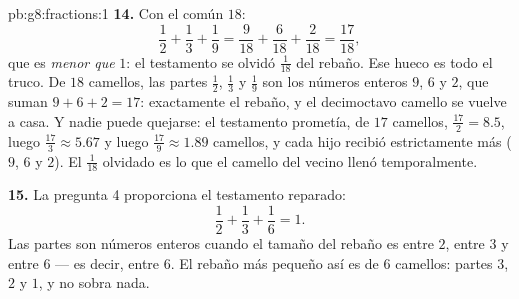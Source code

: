 \begin{solution}{pb:g8:fractions:1}
\textbf{14.} Con el  común $18$:
\[
\frac12 + \frac13 + \frac19
= \frac{9}{18} + \frac{6}{18} + \frac{2}{18}
= \frac{17}{18} ,
\]
que es \emph{menor que} $1$: el testamento se olvidó $\frac{1}{18}$ del
rebaño. Ese hueco es todo el truco. De $18$ camellos, las
partes $\frac12$, $\frac13$ y $\frac19$ son los números enteros $9$,
$6$ y $2$, que suman $9 + 6 + 2 = 17$: exactamente el rebaño,
y el decimoctavo camello se vuelve a casa. Y nadie puede quejarse: el
testamento prometía, de $17$ camellos, $\frac{17}{2} = 8.5$, luego
$\frac{17}{3} \approx 5.67$ y luego $\frac{17}{9} \approx 1.89$
camellos, y cada hijo recibió estrictamente más ($9$, $6$ y $2$).
El $\frac{1}{18}$ olvidado es lo que el camello del vecino
llenó temporalmente.

\textbf{15.} La pregunta 4 proporciona el testamento reparado:
\[
\frac12 + \frac13 + \frac16 = 1 .
\]
Las partes son números enteros cuando el tamaño del rebaño es  entre
$2$, entre $3$ y entre $6$ --- es decir,  entre $6$. El
rebaño más pequeño así es de $6$ camellos: partes $3$, $2$ y $1$, y
no sobra nada.
\end{solution}
